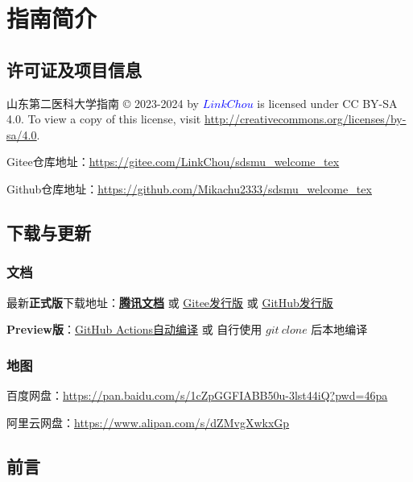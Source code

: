 \chapter[指南简介]{指南简介}

\section[许可证及项目信息]{许可证及项目信息}
山东第二医科大学指南 © 2023-2024 by \textcolor{blue}{$LinkChou$} is licensed under CC BY-SA 4.0. To view a copy of this license, visit \uline{\href{http://creativecommons.org/licenses/by-sa/4.0}{http://creativecommons.org/licenses/by-sa/4.0}}.

Gitee仓库地址：\uline{\href{https://gitee.com/LinkChou/sdsmu_welcome_tex}{https://gitee.com/LinkChou/sdsmu\_welcome\_tex}}

Github仓库地址：\uline{\href{https://github.com/Mikachu2333/sdsmu_welcome_tex}{https://github.com/Mikachu2333/sdsmu\_welcome\_tex}}

\section[\textcolor{red}{下载与更新}]{下载与更新}
\subsection{文档}
最新\textbf{正式版}下载地址：\textbf{\uline{\textcolor{red}{\href{https://docs.qq.com/s/ETcQ-ZFSrSsh6MK9bm773q}{腾讯文档}}}} 或 \uline{\href{https://gitee.com/LinkChou/sdsmu_welcome_tex/releases/latest}{Gitee发行版}} 或 \uline{\href{https://github.com/mikachu2333/sdsmu_welcome_tex/releases/latest}{GitHub发行版}}

\textbf{Preview版}\footnotemark：\uline{\href{https://github.com/Mikachu2333/sdsmu_welcome_tex/actions}{GitHub Actions自动编译}} 或 自行使用 $git\ clone$ 后本地编译

\subsection[地图]{地图}
百度网盘：\uline{\href{https://pan.baidu.com/s/1cZpGGFIABB50u-3lst44iQ?pwd=46pa}{https://pan.baidu.com/s/1cZpGGFIABB50u-3lst44iQ?pwd=46pa}}

阿里云网盘：\uline{\href{https://www.alipan.com/s/dZMvgXwkxGp}{https://www.alipan.com/s/dZMvgXwkxGp}}

\section[前言]{前言}
